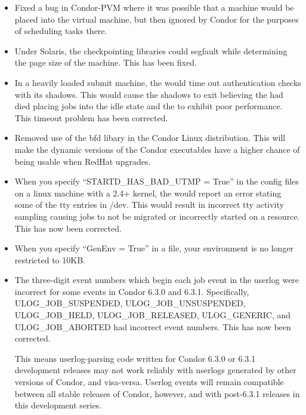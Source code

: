 \begin{itemize}

\item
Fixed a bug in Condor-PVM where it was possible that a machine would be 
placed into the virtual machine, but then ignored by Condor for the purposes
of scheduling tasks there.

\item
Under Solaris, the checkpointing libraries could segfault while determining
the page size of the machine. 
This has been fixed.

\item
In a heavily loaded submit machine, the  would time out
authentication checks with its shadows. 
This would cause the shadows to
exit believing the  had died placing jobs into the idle
state and the  to exhibit poor performance.
This timeout problem has been corrected.

\item
Removed use of the bfd libary in the Condor Linux distribution. 
This will make the dynamic versions of the Condor executables have a
higher chance of being usable when RedHat upgrades.

\item
When you specify ``STARTD\_HAS\_BAD\_UTMP = True'' in the config files
on a linux machine with a 2.4+ kernel, the  would report
an error stating some of the tty entries in /dev. This would result
in incorrect tty activity sampling causing jobs to not be migrated or
incorrectly started on a resource. This has now been corrected.

\item 
When you specify ``GenEnv = True'' in a  file,
your environment is no longer restricted to 10KB.

\item
The three-digit event numbers which begin each job event in the
userlog were incorrect for some events in Condor 6.3.0 and 6.3.1.
Specifically, ULOG\_JOB\_SUSPENDED, ULOG\_JOB\_UNSUSPENDED,
ULOG\_JOB\_HELD, ULOG\_JOB\_RELEASED, ULOG\_GENERIC, and
ULOG\_JOB\_ABORTED had incorrect event numbers.  This has now been
corrected.

\Note This means userlog-parsing code written for Condor 6.3.0 or
6.3.1 development releases may not work reliably with userlogs
generated by other versions of Condor, and visa-versa.  Userlog events
will remain compatible between all stable releases of Condor, however,
and with post-6.3.1 releases in this development series.


\end{itemize}
